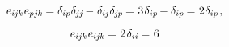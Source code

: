 \nopagebreak\vspace{-0.15em}\begin{equation*}
e_{i\hspace{-0.1ex}j\hspace{-0.1ex}k} \hspace{.1ex} e_{pj\hspace{-0.1ex}k} \hspace{-0.15ex}
= \delta_{ip} \delta_{\hspace{-0.1ex}j\hspace{-0.12ex}j} \hspace{-0.2ex} - \hspace{.1ex} \delta_{i\hspace{-0.1ex}j} \delta_{\hspace{-0.1ex}j\hspace{-0.1ex}p} \hspace{-0.15ex}
= \hspace{.1ex} 3 \hspace{.2ex} \delta_{ip} \hspace{-0.2ex} - \delta_{ip} \hspace{-0.15ex}
= \hspace{.1ex} 2 \hspace{.1ex} \delta_{ip}
\hspace{.2ex} ,
\end{equation*}

\nopagebreak\vspace{-0.15em}\begin{equation*}
e_{i\hspace{-0.1ex}j\hspace{-0.1ex}k} \hspace{.1ex} e_{i\hspace{-0.1ex}j\hspace{-0.1ex}k} \hspace{-0.15ex}
= \hspace{.1ex} 2 \hspace{.2ex} \delta_{ii} \hspace{-0.15ex}
= \hspace{.1ex} 6
\end{equation*}

\vspace{-0.33em}\noindent
{}

